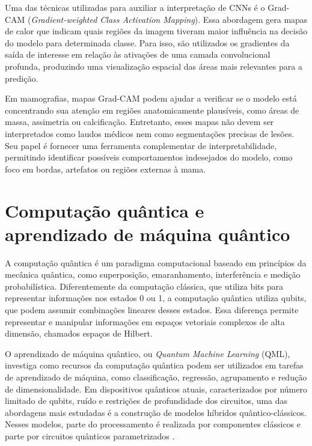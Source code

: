 \documentclass[
    12pt,
    openright,
    oneside,
    a4paper,
    english,
    brazil
]{abntex2}
\begin{document}
Uma das técnicas utilizadas para auxiliar a interpretação de CNNs é o Grad-CAM (\textit{Gradient-weighted Class Activation Mapping}). Essa abordagem gera mapas de calor que indicam quais regiões da imagem tiveram maior influência na decisão do modelo para determinada classe. Para isso, são utilizados os gradientes da saída de interesse em relação às ativações de uma camada convolucional profunda, produzindo uma visualização espacial das áreas mais relevantes para a predição.


Em mamografias, mapas Grad-CAM podem ajudar a verificar se o modelo está concentrando sua atenção em regiões anatomicamente plausíveis, como áreas de massa, assimetria ou calcificação. Entretanto, esses mapas não devem ser interpretados como laudos médicos nem como segmentações precisas de lesões. Seu papel é fornecer uma ferramenta complementar de interpretabilidade, permitindo identificar possíveis comportamentos indesejados do modelo, como foco em bordas, artefatos ou regiões externas à mama.

\section{Computação quântica e aprendizado de máquina quântico}

A computação quântica é um paradigma computacional baseado em princípios da mecânica quântica, como superposição, emaranhamento, interferência e medição probabilística. Diferentemente da computação clássica, que utiliza bits para representar informações nos estados 0 ou 1, a computação quântica utiliza qubits, que podem assumir combinações lineares desses estados. Essa diferença permite representar e manipular informações em espaços vetoriais complexos de alta dimensão, chamados espaços de Hilbert.

O aprendizado de máquina quântico, ou \textit{Quantum Machine Learning} (QML), investiga como recursos da computação quântica podem ser utilizados em tarefas de aprendizado de máquina, como classificação, regressão, agrupamento e redução de dimensionalidade. Em dispositivos quânticos atuais, caracterizados por número limitado de qubits, ruído e restrições de profundidade dos circuitos, uma das abordagens mais estudadas é a construção de modelos híbridos quântico-clássicos. Nesses modelos, parte do processamento é realizada por componentes clássicos e parte por circuitos quânticos parametrizados \cite{biamonte2017qml,preskill2018nisq,cerezo2021variational}.
\end{document}
